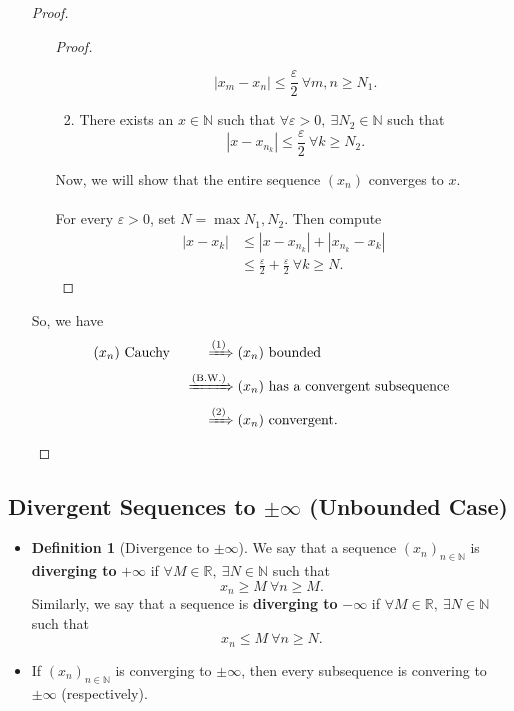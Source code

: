 \documentclass{article}
\newcommand{\R}{\mathbb{R}}
\newcommand{\N}{\mathbb{N}}
\newcommand{\seq}[2]{(#1_{#2})_{#2 \in \N}}
\newcommand{\?}{\stackrel{?}{=}}
\theoremstyle{definition} %
\newtheorem{definition}[subsection]{Definition} %
\begin{document}
\begin{itemize}
\begin{proof}
\begin{enumerate}[label=(\arabic*)]
\begin{proof}
\begin{enumerate}[label=(\roman*)]
                    $$|x_m - x_n| \leq \frac{\varepsilon}{2} \ \forall m, n \geq N_1.$$
                    \item There exists an $x \in \N$ such that $\forall \varepsilon > 0, \ \exists N_2 \in \N$ such that
                    $$|x - x_{n_k}| \leq \frac{\varepsilon}{2} \ \forall k \geq N_2.$$
                \end{enumerate}
                Now, we will show that the entire sequence $(x_n)$ converges to $x$. \\\\
                For every $\varepsilon > 0$, set $N = \max{N_1, N_2}$. Then compute
                \begin{align*}
                    |x - x_k| &\leq |x - x_{n_k}| + |x_{n_k} - x_k| \\
                    &\leq \frac{\varepsilon}{2} + \frac{\varepsilon}{2} \ \forall k \geq N.
                \end{align*}
            \end{proof}
        \end{enumerate}
        So, we have
        \begin{alignat*}{2}
            (x_n) \text{ Cauchy } &&\xRightarrow{\text{(1)}} (x_n) &\text{ bounded } \\
            &&\xRightarrow{\text{(B.W.)}} (x_n) &\text{ has a convergent subsequence} \\
            &&\xRightarrow{\text{(2)}} (x_n) &\text{ convergent}.
        \end{alignat*}
    \end{proof}
\end{itemize}

\subsection{Divergent Sequences to $\pm \infty$ (Unbounded Case)}

\begin{itemize}
    \item[]
    \begin{definition}[Divergence to $\pm \infty$]
        We say that a sequence $\seq{x}{n}$ is \textbf{diverging to} $+\infty$ if $\forall M \in \R, \ \exists N \in \N$ such that
    $$x_n \geq M \ \forall n \geq M.$$
    Similarly, we say that a sequence is \textbf{diverging to} $-\infty$ if $\forall M \in \R, \ \exists N \in \N$ such that
    $$x_n \leq M \ \forall n \geq N.$$
    \end{definition}
    \item[]
    \begin{lemma}
        If $\seq{x}{n}$ is converging to $\pm \infty$, then every subsequence is convering to $\pm \infty$ (respectively).
    \end{lemma}
\end{itemize}
\end{document}
